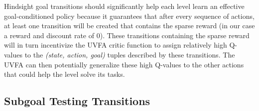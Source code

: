\documentclass{article} %
\begin{document}

Hindsight goal transitions should significantly help each level learn an effective goal-conditioned policy because it guarantees that after every sequence of actions, at least one transition will be created that contains the sparse reward (in our case a reward and discount rate of 0).  These transitions containing the sparse reward will in turn incentivize the UVFA critic function to assign relatively high Q-values to the \textit{(state, action, goal)} tuples described by these transitions.  The UVFA can then potentially generalize these high Q-values to the other actions that could help the level solve its tasks. 

\subsection{Subgoal Testing Transitions}
\end{document}
